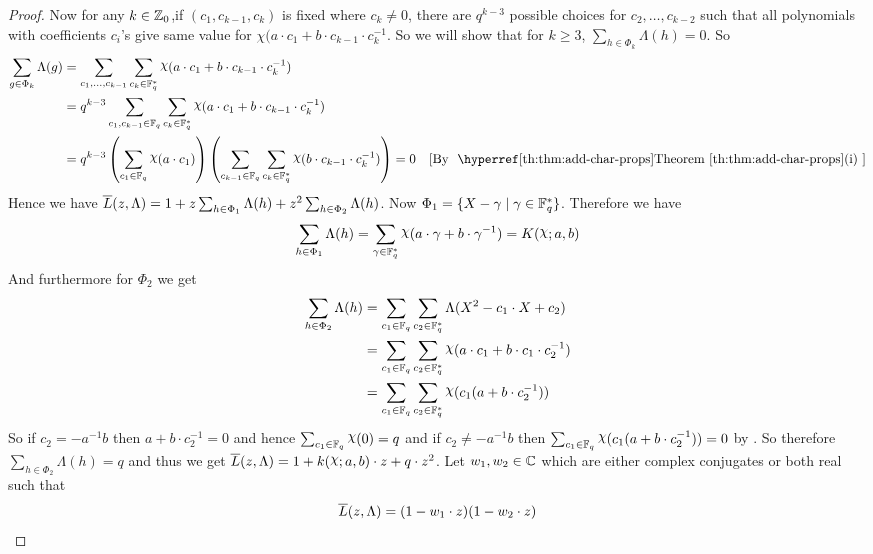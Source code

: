 \begin{proof}
  Now for any $k\in\mathbb{Z}_0$,if  $(c_1,c_{k-1},c_k)$ is fixed where $c_k\neq 0$, there are $q^{k-3}$ possible choices for $c_2,\dots, c_{k-2}$ such that all polynomials with coefficients $c_i$'s give same value for $\chi(a\cdot c_1+b\cdot  c_{k-1}\cdot c_k^{-1}$. So we will show that for $k\geq 3$, $\sum_{h\in\Phi_k}\Lambda(h)=0$. So 
  \begin{align*}
    \sum_{g\in\Phi_k}\Lambda(g) & = \sum_{c_1,\dots, c_{k-1}}\sum_{c_k\in\bbF_q^*}\chi(a\cdot c_1+b\cdot c_{k-1}\cdot c_k^{-1})\\ 
    & = q^{k-3}\sum_{c_1,c_{k-1}\in \bbF_q}\sum_{c_k\in\bbF_q^*}\chi(a\cdot c_1+b\cdot c_{k-1}\cdot c_k^{-1})\\ 
    & = q^{k-3}\lt(\sum_{c_1\in\bbF_q}\chi(a\cdot c_1)\rt)\lt( \sum_{c_{k-1}\in \bbF_q}\sum_{c_k\in\bbF_q^*}\chi(b\cdot c_{k-1}\cdot c_k^{-1})\rt)= 0 \by{\AddCharPropsthm[(i)]}
  \end{align*} Hence we have $\overline{L}(z,\Lambda)=1+z\sum_{h\in\Phi_1}\Lambda(h)+z^2\sum_{h\in\Phi_2}\Lambda(h)$. Now $\Phi_1=\{X-\gamma\mid \gamma\in\mathbb{F}_q^*\}$. Therefore we have $$\sum_{h\in\Phi_1}\Lambda(h)=\sum_{\gm\in\bbF_q^*}\chi(a\cdot \gm+b\cdot \gm^{-1})=K(\chi;a,b)$$And furthermore for $\Phi_2$ we get \begin{align*}
    \sum_{h\in\Phi_2}\Lambda(h) & = \sum_{c_1\in\bbF_q}\sum_{c_2\in\bbF_q^*}\Lambda(X^2-c_1\cdot X+c_2)\\ 
    & = \sum_{c_1\in\bbF_q}\sum_{c_2\in\bbF_q^*}\chi(a\cdot c_1+b\cdot c_1\cdot c_2^{-1})\\ 
    & = \sum_{c_1\in\bbF_q}\sum_{c_2\in\bbF_q^*}\chi(c_1(a+b\cdot c_2^{-1}))
  \end{align*}
  So if $c_2=-a^{-1}b$ then $a+b\cdot c_2^{-1}=0$ and hence $\sum_{c_1\in\bbF_q}\chi(0)=q$ and if $c_2\neq -a^{-1}b$ then $\sum_{c_1\in\bbF_q}\chi(c_1(a+b\cdot c_2^{-1}))=0$ by \AddCharPropsthm[(i)]. So therefore $\sum_{h\in\Phi_2}\Lambda(h)=q$ and thus we get $\ovL(z,\Lambda)=1+k(\chi;a,b)\cdot z+q\cdot z^2$. Let $w_1,w_2\in\mathbb{C}$ which are either complex conjugates or both real such that $$\overline{L}(z,\Lambda)=(1-w_1\cdot z)(1-w_2\cdot z)$$


\end{proof}
